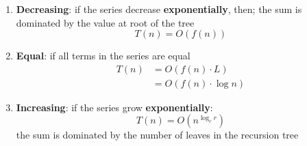     \begin{enumerate}
      \item \textbf{Decreasing}: if the series decrease \textbf{exponentially},
      then; the sum is dominated by the value at root of the tree
      \begin{equation}
        T\left( n \right) = O\left( f\left( n \right) \right)
      \end{equation}

      \item \textbf{Equal}: if all terms in the series are equal
      \begin{align}
        T\left( n \right) &= O\left( f\left( n \right) \cdot L \right) \\
        &= O\left( f\left( n \right) \cdot \log n \right)
      \end{align}

      \item \textbf{Increasing}: if the series grow \textbf{exponentially}:
      \begin{equation}
        T\left( n \right) = O\left( n^{\log_{c} r} \right)
      \end{equation}
      the sum is dominated by the number of leaves in the recursion tree
    \end{enumerate}
